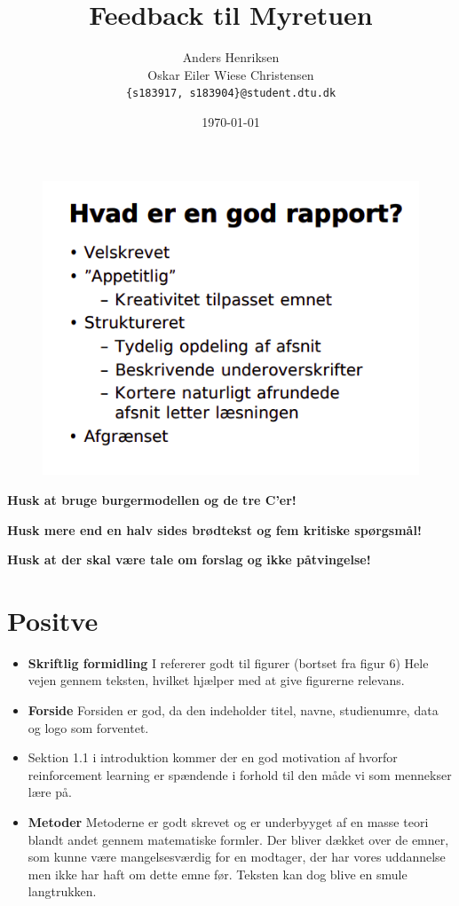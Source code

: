 \documentclass[11pt, fleqn, titlepage]{article}
\title{Feedback til Myretuen}
\author{Anders Henriksen \\ Oskar Eiler Wiese Christensen  \\ \texttt{\{s183917, s183904\}@student.dtu.dk}}
\date{\today}
\begin{document}
	
	\maketitle
	
		\begin{figure}[H]
		\centering
		\includegraphics[width=0.4\linewidth]{"billeder/Screenshot from 2020-03-24 08-21-13"}
	\end{figure}
	
	\textbf{Husk at bruge burgermodellen og de tre C'er!}
	
	\textbf{Husk mere end en halv sides brødtekst og fem kritiske spørgsmål!}
	
	\textbf{Husk at der skal være tale om forslag og ikke påtvingelse!}
	
	\section{Positve}
	
	\begin{itemize}
		
		\item \textbf{Skriftlig formidling} I refererer godt til figurer (bortset fra figur 6) Hele vejen gennem teksten, hvilket hjælper med at give figurerne relevans. 
		
		\item \textbf{Forside} Forsiden er god, da den indeholder titel, navne, studienumre, data og logo som forventet.
		
		\item Sektion 1.1 i introduktion kommer der en god motivation af hvorfor reinforcement learning er spændende i forhold til den måde vi som mennekser lære på. 
		
		\item \textbf{Metoder} Metoderne er godt skrevet og er underbyyget af en masse teori blandt andet gennem matematiske formler. Der bliver dækket over de emner, som kunne være mangelsesværdig for en modtager, der har vores uddannelse men ikke har haft om dette emne før. Teksten kan dog blive en smule langtrukken. 
		
	
		
	\end{itemize}
	
\end{document}
